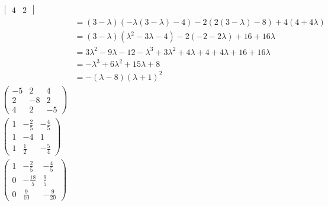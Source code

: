 \documentclass{article}
\begin{document}
\begin{align*}
\begin{vmatrix}
                                                                                                 4 & 2
                                                                                               \end{vmatrix}                                     \\
                                         & = (3 - \lambda)(-\lambda (3 - \lambda) - 4) - 2 (2 (3 - \lambda) - 8) + 4 (4 + 4 \lambda)              \\
                                         & = (3 - \lambda) (\lambda^2 - 3 \lambda - 4) - 2 (-2 - 2 \lambda) + 16 + 16 \lambda                     \\
                                         & = 3 \lambda^2 - 9 \lambda - 12 - \lambda^3 + 3 \lambda^2 + 4 \lambda + 4 + 4 \lambda + 16 + 16 \lambda \\
                                         & = -\lambda^3 + 6 \lambda^2 + 15 \lambda + 8                                                            \\
                                         & = -(\lambda - 8) (\lambda + 1)^2                                                                       \\
  \begin{pmatrix}
    -5 & 2  & 4  \\
    2  & -8 & 2  \\
    4  & 2  & -5
  \end{pmatrix}                                                                                                                                  \\
  \begin{pmatrix}
    1 & -\frac{2}{5} & -\frac{4}{5} \\
    1 & -4           & 1            \\
    1 & \frac{1}{2}  & -\frac{5}{4}
  \end{pmatrix}                                                                                                                 \\
  \begin{pmatrix}
    1 & -\frac{2}{5}  & -\frac{4}{5}  \\
    0 & -\frac{18}{5} & \frac{9}{5}   \\
    0 & \frac{9}{10}  & -\frac{9}{20}
  \end{pmatrix}                                                                                                               \\

\end{align*}
\end{document}
